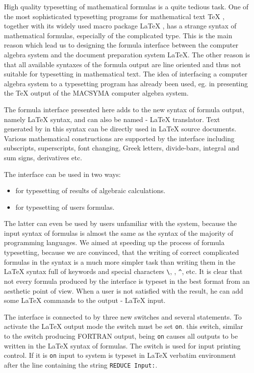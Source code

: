 
High quality typesetting of mathematical formulas is a quite tedious
task.  One of the most sophisticated typesetting programs for
mathematical text \TeX{} \cite{Knuth:84}, together with its widely used
macro package \LaTeX{} \cite{Lamport:86}, has a strange syntax of
mathematical formulas, especially of the complicated type.  This is the
main reason which lead us to designing the formula interface between the
computer algebra system \REDUCE{} and the document preparation system
\LaTeX{}.  The other reason is that all available syntaxes of the
\REDUCE{} formula output are line oriented and thus not suitable for
typesetting in mathematical text.  The idea of interfacing a computer
algebra system to a typesetting program has already been used, eg.  in
\cite{Fateman:87} presenting the \TeX{} output of the MACSYMA computer
algebra system.

The formula interface presented here adds to \REDUCE{} the new syntax of
formula output, namely \LaTeX{} syntax, and can also be named \REDUCE{} -
\LaTeX{} translator.  Text generated by \REDUCE{} in this syntax can be
directly used in \LaTeX{} source documents.  Various mathematical
constructions are supported by the interface including subscripts,
superscripts, font changing, Greek letters, divide-bars, integral and
sum signs, derivatives etc.

The interface can be used in two ways:
\begin{itemize}
\item for typesetting of results of \REDUCE{} algebraic calculations.
\item for typesetting of users formulas.
\end{itemize}

The latter can even be used by users unfamiliar with the \REDUCE{}
system, because the \REDUCE{} input syntax of formulas is almost the
same as the syntax of the majority of programming languages.  We aimed
at speeding up the process of formula typesetting, because we are
convinced, that the writing of correct complicated formulas in the
\REDUCE{} syntax is a much more simpler task than writing them in the
\LaTeX{} syntax full of keywords and special characters
\texttt{\textbackslash}, \texttt{\textbraceleft}, \texttt{\textasciicircum},
etc.  It is clear that not every formula produced by the interface is
typeset in the best format from an aesthetic point of view.  When a user
is not satisfied with the result, he can add some \LaTeX{} commands to the
\REDUCE{} output - \LaTeX{} input.

The interface is connected to \REDUCE{} by three new switches and
several statements.  To activate the \LaTeX{} output mode the switch 
must be set \texttt{on}.  this switch, similar to the switch 
producing FORTRAN output, being \texttt{on} causes all outputs to be
written in the \LaTeX{} syntax of formulas.  The switch  is
used for input printing control.  If it is \texttt{on} input to \REDUCE{} system
is typeset in \LaTeX{} verbatim environment after the line containing
the string \texttt{REDUCE Input:}.

